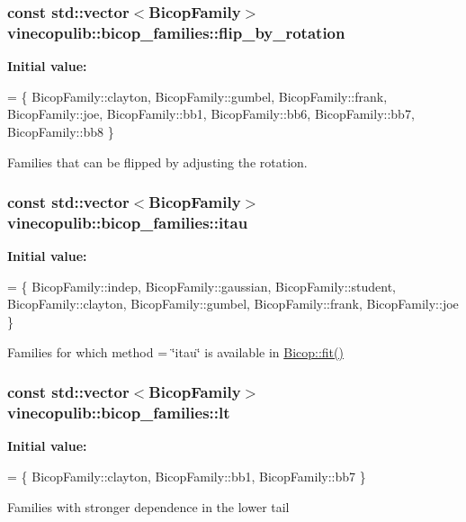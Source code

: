\subsubsection[{\texorpdfstring{flip\+\_\+by\+\_\+rotation}{flip_by_rotation}}]{\setlength{\rightskip}{0pt plus 5cm}const std\+::vector$<${\bf Bicop\+Family}$>$ vinecopulib\+::bicop\+\_\+families\+::flip\+\_\+by\+\_\+rotation}\hypertarget{namespacevinecopulib_1_1bicop__families_ae1ae1673e3d4a9c57bd9df074e17a3b9}{}\label{namespacevinecopulib_1_1bicop__families_ae1ae1673e3d4a9c57bd9df074e17a3b9}
{\bfseries Initial value\+:}
\begin{DoxyCode}
= \{
    BicopFamily::clayton,
    BicopFamily::gumbel,
    BicopFamily::frank,
    BicopFamily::joe,
    BicopFamily::bb1,
    BicopFamily::bb6,
    BicopFamily::bb7,
    BicopFamily::bb8
\}
\end{DoxyCode}
Families that can be flipped by adjusting the rotation. 
\subsubsection[{\texorpdfstring{itau}{itau}}]{\setlength{\rightskip}{0pt plus 5cm}const std\+::vector$<${\bf Bicop\+Family}$>$ vinecopulib\+::bicop\+\_\+families\+::itau}\hypertarget{namespacevinecopulib_1_1bicop__families_af92a2e71f03e2280276533def655760d}{}\label{namespacevinecopulib_1_1bicop__families_af92a2e71f03e2280276533def655760d}
{\bfseries Initial value\+:}
\begin{DoxyCode}
= \{
    BicopFamily::indep,
    BicopFamily::gaussian,
    BicopFamily::student,
    BicopFamily::clayton,
    BicopFamily::gumbel,
    BicopFamily::frank,
    BicopFamily::joe
\}
\end{DoxyCode}
Families for which {\ttfamily method = \char`\"{}itau\char`\"{}} is available in \hyperlink{classvinecopulib_1_1_bicop_a2d509a8b404a73ef17f04a0678e90a71}{Bicop\+::fit()} 
\subsubsection[{\texorpdfstring{lt}{lt}}]{\setlength{\rightskip}{0pt plus 5cm}const std\+::vector$<${\bf Bicop\+Family}$>$ vinecopulib\+::bicop\+\_\+families\+::lt}\hypertarget{namespacevinecopulib_1_1bicop__families_a5a5f349f07638768ff8b1bb2ae90d102}{}\label{namespacevinecopulib_1_1bicop__families_a5a5f349f07638768ff8b1bb2ae90d102}
{\bfseries Initial value\+:}
\begin{DoxyCode}
= \{
    BicopFamily::clayton,
    BicopFamily::bb1,
    BicopFamily::bb7
\}
\end{DoxyCode}
Families with stronger dependence in the lower tail 
